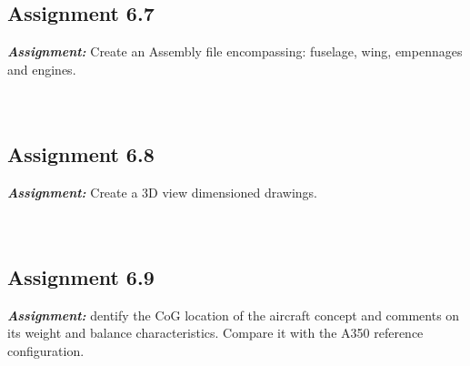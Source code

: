 \documentclass{article}
\begin{document}
\clearpage






\subsection{Assignment 6.7\label{Assignment_6.7}}

\textbf{\textit{Assignment:}} Create an Assembly file encompassing: 
fuselage, wing, empennages and engines. \\ \\ \\ 

\clearpage

\subsection{Assignment 6.8\label{Assignment_6.8}}

\textbf{\textit{Assignment:}} Create a 3D view dimensioned drawings. \\ \\ \\ 

\clearpage

\subsection{Assignment 6.9\label{Assignment_6.9}}

\textbf{\textit{Assignment:}} dentify the CoG location of the aircraft concept and comments
on its weight and balance characteristics. 
Compare it with the A350 reference configuration. \\ \\ \\ 

\clearpage




\pagebreak
\printbibliography
    
\end{document}
